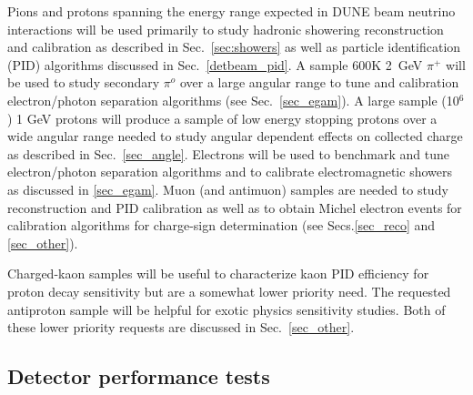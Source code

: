 Pions and protons spanning the energy range expected in DUNE beam neutrino interactions will be used 
primarily to study hadronic showering reconstruction and calibration as described in Sec.~\ref{sec:showers}
 as well as particle identification (PID) algorithms discussed in Sec.~\ref{detbeam_pid}. A sample 600K
 2~GeV $\pi^+$ will be used to study  secondary $\pi^o$ over a large angular range 
to tune and calibration electron/photon separation algorithms (see Sec.~\ref{sec_egam}).
A large sample (10$^{6}$) 1 GeV protons will produce a sample of low energy stopping protons over a 
wide angular range needed to study angular
dependent effects on collected charge as described in Sec.~\ref{sec_angle}.
Electrons will be used to benchmark and tune  electron/photon separation algorithms and to calibrate 
electromagnetic showers as discussed in \ref{sec_egam}.
Muon (and antimuon) samples are needed to study reconstruction and PID calibration as well as to obtain 
Michel electron events for calibration  
algorithms for charge-sign determination (see Secs.\ref{sec_reco} and \ref{sec_other}).

Charged-kaon samples will be useful to characterize kaon PID efficiency for proton decay sensitivity but
are a somewhat lower priority need. The requested antiproton sample
will be helpful for exotic physics sensitivity studies. Both of these lower priority requests are discussed
in Sec.~\ref{sec_other}.


\subsection{Detector performance tests}


